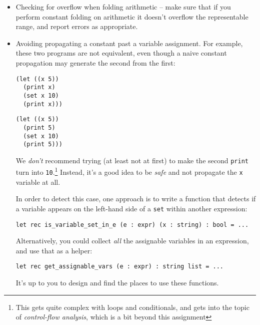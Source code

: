\documentclass[10pt, oneside]{article}
\begin{document}
\begin{itemize}

\item Checking for overflow when folding arithmetic -- make sure that if you
perform constant folding on arithmetic it doesn't overflow the representable
range, and report errors as appropriate.

\item Avoiding propagating a constant past a variable assignment. For
example, these two programs are not equivalent, even though a naive constant
propagation may generate the second from the first:

\begin{lstlisting}
(let ((x 5))
  (print x)
  (set x 10)
  (print x)))
\end{lstlisting}

\begin{lstlisting}
(let ((x 5))
  (print 5)
  (set x 10)
  (print 5)))
\end{lstlisting}

We {\it don't} recommend trying (at least not at first) to make the second
{\tt print} turn into {\tt 10}.\footnote{This gets quite complex with loops
and conditionals, and gets into the topic of {\it control-flow analysis},
which is a bit beyond this assignment} Instead, it's a good idea to be {\it
safe} and not propagate the {\tt x} variable at all.

In order to detect this case, one approach is to write a function that
detects if a variable appears on the left-hand side of a {\tt set} within
another expression:

\begin{verbatim}
let rec is_variable_set_in_e (e : expr) (x : string) : bool = ...
\end{verbatim}

Alternatively, you could collect {\it all} the assignable variables in an
expression, and use that as a helper:

\begin{verbatim}
let rec get_assignable_vars (e : expr) : string list = ...
\end{verbatim}

It's up to you to design and find the places to use these functions.

\end{itemize}
\end{document}

